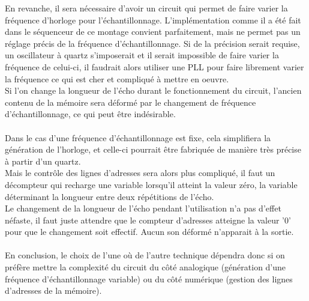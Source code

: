 \documentclass{article}
\begin{document}
En revanche, il sera nécessaire d'avoir un circuit qui permet de faire varier la fréquence d'horloge pour l'échantillonnage. L'implémentation comme il a été fait dans le séquenceur de ce montage convient parfaitement, mais ne permet pas un réglage précis de la fréquence d'échantillonnage. Si de la précision serait requise, un oscillateur à quartz s'imposerait et il serait impossible de faire varier la fréquence de celui-ci, il faudrait alors utiliser une PLL pour faire librement varier la fréquence ce qui est cher et compliqué à mettre en oeuvre.
\\
Si l'on change la longueur de l'écho durant le fonctionnement du circuit, l'ancien contenu de la mémoire sera déformé par le changement de fréquence d'échantillonnage, ce qui peut être indésirable.
\\\\
Dans le cas d'une fréquence d'échantillonnage est fixe, cela simplifiera la génération de l'horloge, et celle-ci pourrait être fabriquée de manière très précise à partir d'un quartz.
\\
Mais le contrôle des lignes d'adresses sera alors plus compliqué, il faut un décompteur qui recharge une variable lorsqu'il atteint la valeur zéro, la variable déterminant la longueur entre deux répétitions de l'écho.
\\
Le changement de la longueur de l'écho pendant l'utilisation n'a pas d'effet néfaste, il faut juste attendre que le compteur d'adresses atteigne la valeur '0' pour que le changement soit effectif. Aucun son déformé n'apparait à la sortie.
\\\\
En conclusion, le choix de l'une où de l'autre technique dépendra donc si on préfère mettre la complexité du circuit du côté analogique (génération d'une fréquence d'échantillonnage variable) ou du côté numérique (gestion des lignes d'adresses de la mémoire).
\end{document}

